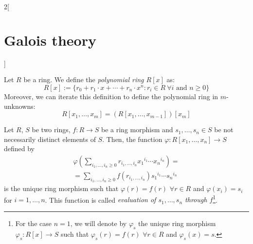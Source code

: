 \documentclass[../../../main.tex]{subfiles}
\begin{document}
\begin{multicols}{2}[\section{Galois theory}]
\begin{prop}
  \end{prop}
  \begin{definition}
    Let $R$ be a ring. We define the  \textit{polynomial ring $R[x]$} as: $$R[x]:=\{r_0+r_1\cdot x+\cdots+r_n\cdot x^n:r_i\in R\ \forall i\text{ and }n\geq 0\}$$ Moreover, we can iterate this definition to define the polynomial ring in $m$-unknowns: $$R[x_1,\ldots,x_m]=\left(R[x_1,\ldots,x_{m-1}]\right)[x_m]$$
  \end{definition}
  \begin{prop}
    Let $R$, $S$ be two rings, $f:R\rightarrow S$ be a ring morphism and $s_1,\ldots,s_n\in S$ be not necessarily distinct elements of $S$. Then, the function $\varphi:R[x_1,\ldots,x_n]\rightarrow S$ defined by
    \begin{multline*}
      \varphi\left(\sum_{i_1,\ldots,i_n\geq 0}r_{i_1,\ldots,i_n}{x_1}^{i_1}\cdots {x_n}^{i_n}\right)=\\=\sum_{i_1,\ldots,i_n\geq 0}f(r_{i_1,\ldots,i_n}){s_1}^{i_1}\cdots {s_n}^{i_n}
    \end{multline*}
    is the unique ring morphism such that $\varphi(r)=f(r)$ $\forall r\in R$ and $\varphi(x_i)=s_i$ for $i=1,\ldots,n$. This function is called \textit{evaluation of $s_1,\ldots,s_n$ through $f$}\footnote{For the case $n=1$, we will denote by $\varphi_s$ the unique ring morphism $\varphi_s:R[x]\rightarrow S$ such that $\varphi_s(r)=f(r)$ $\forall r\in R$ and $\varphi_s(x)=s$.}.
  \end{prop}

\end{multicols}
\end{document}
